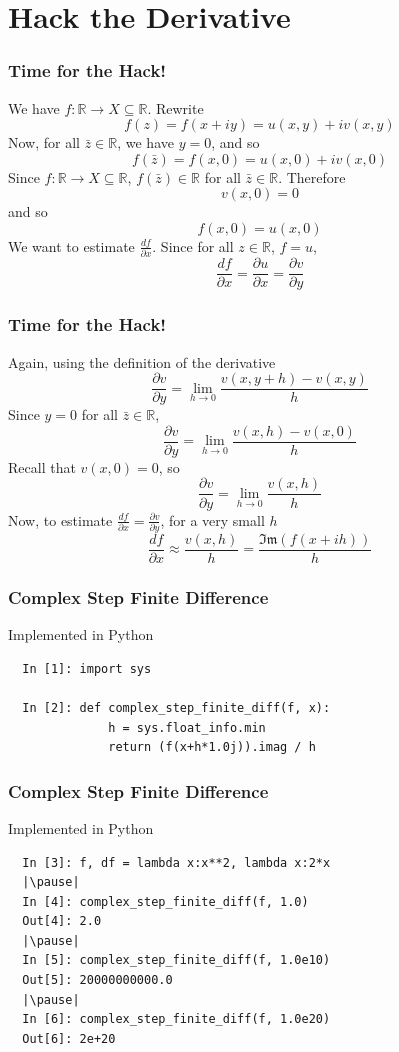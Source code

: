 \documentclass{beamer}
\def\R{\mathbb{R}}                     %
\begin{document}
\section{Hack the Derivative}
\begin{frame}
\frametitle{Time for the Hack!}

  We have $f:\R \to X \subseteq \R$. Rewrite
  \[ f(z) = f(x+iy) = u(x,y) + iv(x,y) \]
  \pause
  Now, for all $\bar{z} \in \R$, we have $y = 0$, and so
  \[ f(\bar{z}) = f(x,0) = u(x,0) + iv(x,0) \]
  \pause
  Since $f: \R \to X \subseteq \R$, $f(\bar{z}) \in \R$ for all $\bar{z} \in \R$. Therefore
  \[ v(x,0) = 0 \]
  \pause
  and so
  \[ f(x,0) = u(x,0) \]
  \pause
  We want to estimate $\frac{df}{\partial x}$. Since for all $z \in \R$, $f = u$,
  \[ \frac{df}{\partial x} = \frac{\partial u}{\partial x} = \frac{\partial v}{\partial y} \]

\end{frame}

\begin{frame}
\frametitle{Time for the Hack!}

  Again, using the definition of the derivative
  \[ \frac{\partial v}{\partial y} = \lim_{h \to 0} \frac{v(x,y+h) - v(x,y)}{h} \]
  \pause
  Since $y = 0$ for all $\bar{z} \in \R$,
  \[ \frac{\partial v}{\partial y} = \lim_{h \to 0} \frac{v(x,h) - v(x,0)}{h} \]
  \pause
  Recall that $v(x,0) = 0$, so
  \[ \frac{\partial v}{\partial y} = \lim_{h \to 0} \frac{v(x,h)}{h} \]
  \pause
  Now, to estimate $\frac{df}{\partial x} = \frac{\partial v}{\partial y}$, for a very small $h$
  \[ \frac{df}{\partial x} \approx \frac{v(x,h)}{h} = \frac{\mathfrak{Im}(f(x+ih))}{h} \]


\end{frame}

\begin{frame}[fragile]
\frametitle{Complex Step Finite Difference}

Implemented in Python


\begin{lstlisting}
  In [1]: import sys

  In [2]: def complex_step_finite_diff(f, x):
              h = sys.float_info.min
              return (f(x+h*1.0j)).imag / h
\end{lstlisting}
\end{frame}

\begin{frame}[fragile]
\frametitle{Complex Step Finite Difference}

Implemented in Python


\begin{lstlisting}
  In [3]: f, df = lambda x:x**2, lambda x:2*x
  |\pause|
  In [4]: complex_step_finite_diff(f, 1.0)
  Out[4]: 2.0
  |\pause|
  In [5]: complex_step_finite_diff(f, 1.0e10)
  Out[5]: 20000000000.0
  |\pause|
  In [6]: complex_step_finite_diff(f, 1.0e20)
  Out[6]: 2e+20


\end{lstlisting}
\end{frame}
\end{document}
